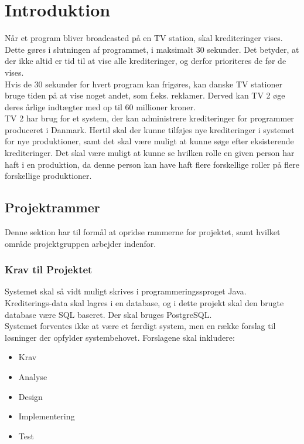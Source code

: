 \section{Introduktion}

Når et program bliver broadcasted på en TV station, skal krediteringer vises. Dette gøres i slutningen af programmet, i maksimalt 30 sekunder. Det betyder, at der ikke altid er tid til at vise alle krediteringer, og derfor prioriteres de før de vises. \\
Hvis de 30 sekunder for hvert program kan frigøres, kan danske TV stationer bruge tiden på at vise noget andet, som f.eks. reklamer. Derved kan TV 2 øge deres årlige indtægter med op til 60 millioner kroner. \\
TV 2 har brug for et system, der kan administrere krediteringer for programmer produceret i Danmark. Hertil skal der kunne tilføjes nye krediteringer i systemet for nye produktioner, samt det skal være muligt at kunne søge efter eksisterende krediteringer. Det skal være muligt at kunne se hvilken rolle en given person har haft i en produktion, da denne person kan have haft flere forskellige roller på flere forskellige produktioner.

\subsection{Projektrammer}
Denne sektion har til formål at opridse rammerne for projektet, samt hvilket område projektgruppen arbejder indenfor.

\subsubsection{Krav til Projektet}
Systemet skal så vidt muligt skrives i programmeringssproget Java. \\
Krediterings-data skal lagres i en database, og i dette projekt skal den brugte database være SQL baseret. Der skal bruges PostgreSQL.\\
Systemet forventes ikke at være et færdigt system, men en række forslag til løsninger der opfylder systembehovet. Forslagene skal inkludere:

\begin{itemize}
    \item Krav
    \item Analyse
    \item Design
    \item Implementering
    \item Test
\end{itemize}

